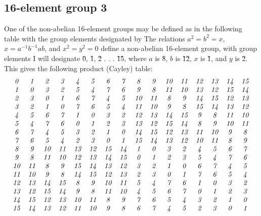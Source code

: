 \documentclass[12pt]{article}
\begin{document}
\subsection{16-element group 3}
 One of the non-abelian 16-element groups may be defined as in the
following table with the group elements designated by 
The relations $a^2 = b^2 = x$, $x = a^{-1}b^{-1}ab$, and $x^2 = y^2 =0$
define a non-abelian 16-element group, with group elements I will designate
\G0, \G1, \G2 . . . \G1\G5, where $a$ is \G8, $b$ is \G1\G2, $x$ is \G1,
and $y$ is \G2.  This gives the following product (Cayley) table:
\begin{equation}
\begin{array}{cccccccccccccccc}
\G0 & \G1 & \G2 & \G3 & \G4 & \G5 & \G6 & \G7 & \G8 & \G9 & \G1\G0 & \G1\G1 & 
\G1\G2 & \G1\G3 & \G1\G4 & \G1\G5\\
\G1 & \G0 & \G3 & \G2 & \G5 & \G4 & \G7 & \G6 & \G9 & \G8 & \G1\G1 & \G1\G0 & 
\G1\G3 & \G1\G2 & \G1\G5 & \G1\G4\\
\G2 & \G3 & \G0 & \G1 & \G6 & \G7 & \G4 & \G5 & \G1\G0 & \G1\G1 & \G8 & \G9 & 
\G1\G4 & \G1\G5 & \G1\G2 & \G1\G3\\
\G3 & \G2 & \G1 & \G0 & \G7 & \G6 & \G5 & \G4 & \G1\G1 & \G1\G0 & \G9 & \G8 & 
\G1\G5 & \G1\G4 & \G1\G3 & \G1\G2\\
\G4 & \G5 & \G6 & \G7 & \G1 & \G0 & \G3 & \G2 & \G1\G2 & \G1\G3 & \G1\G4 & \G1\G5 & 
\G9 & \G8 & \G1\G1 & \G1\G0\\
\G5 & \G4 & \G7 & \G6 & \G0 & \G1 & \G2 & \G3 & \G1\G3 & \G1\G2 & \G1\G5 & \G1\G4 & 
\G8 & \G9 & \G1\G0 & \G1\G1\\
\G6 & \G7 & \G4 & \G5 & \G3 & \G2 & \G1 & \G0 & \G1\G4 & \G1\G5 & \G1\G2 & \G1\G3 & 
\G1\G1 & \G1\G0 & \G9 & \G8\\
\G7 & \G6 & \G5 & \G4 & \G2 & \G3 & \G0 & \G1 & \G1\G5 & \G1\G4 & \G1\G3 & \G1\G2 & 
\G1\G0 & \G1\G1 & \G8 & \G9\\
\G8 & \G9 & \G1\G0 & \G1\G1 & \G1\G3 & \G1\G2 & \G1\G5 & \G1\G4 & \G1 & \G0 & \G3 & \G2 & 
\G4 & \G5 & \G6 & \G7\\
\G9 & \G8 & \G1\G1 & \G1\G0 & \G1\G2 & \G1\G3 & \G1\G4 & \G1\G5 & \G0 & \G1 & \G2 & \G3 & 
\G5 & \G4 & \G7 & \G6\\
\G1\G0 & \G1\G1 & \G8 & \G9 & \G1\G5 & \G1\G4 & \G1\G3 & \G1\G2 & \G3 & \G2 & \G1 & \G0 & 
\G6 & \G7 & \G4 & \G5\\
\G1\G1 & \G1\G0 & \G9 & \G8 & \G1\G4 & \G1\G5 & \G1\G2 & \G1\G3 & \G2 & \G3 & \G0 & \G1 & 
\G7 & \G6 & \G5 & \G4\\
\G1\G2 & \G1\G3 & \G1\G4 & \G1\G5 & \G8 & \G9 & \G1\G0 & \G1\G1 & \G5 & \G4 & \G7 & \G6 & 
\G1 & \G0 & \G3 & \G2\\
\G1\G3 & \G1\G2 & \G1\G5 & \G1\G4 & \G9 & \G8 & \G1\G1 & \G1\G0 & \G4 & \G5 & \G6 & \G7 & 
\G0 & \G1 & \G2 & \G3\\
\G1\G4 & \G1\G5 & \G1\G2 & \G1\G3 & \G1\G0 & \G1\G1 & \G8 & \G9 & \G7 & \G6 & \G5 & \G4 & 
\G3 & \G2 & \G1 & \G0\\
\G1\G5 & \G1\G4 & \G1\G3 & \G1\G2 & \G1\G1 & \G1\G0 & \G9 & \G8 & \G6 & \G7 & \G4 & \G5 & 
\G2 & \G3 & \G0 & \G1
\end{array}
\end{equation}
\end{document}

